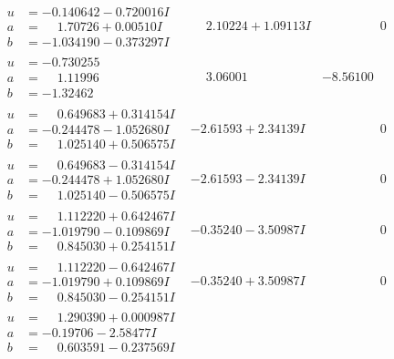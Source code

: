 \documentclass[1p]{elsarticle_modified}
\theoremstyle{definition}
\begin{document}
$$\begin{array}{c|c|c}
\begin{aligned}
u &= -0.140642 - 0.720016 I \\
a &= \phantom{-}1.70726 + 0.00510 I \\
b &= -1.034190 - 0.373297 I\end{aligned}
 & \phantom{-}2.10224 + 1.09113 I & \phantom{-0.000000 } 0 \\ \hline\begin{aligned}
u &= -0.730255\phantom{ +0.000000I} \\
a &= \phantom{-}1.11996\phantom{ +0.000000I} \\
b &= -1.32462\phantom{ +0.000000I}\end{aligned}
 & \phantom{-}3.06001\phantom{ +0.000000I} & -8.56100\phantom{ +0.000000I} \\ \hline\begin{aligned}
u &= \phantom{-}0.649683 + 0.314154 I \\
a &= -0.244478 - 1.052680 I \\
b &= \phantom{-}1.025140 + 0.506575 I\end{aligned}
 & -2.61593 + 2.34139 I & \phantom{-0.000000 } 0 \\ \hline\begin{aligned}
u &= \phantom{-}0.649683 - 0.314154 I \\
a &= -0.244478 + 1.052680 I \\
b &= \phantom{-}1.025140 - 0.506575 I\end{aligned}
 & -2.61593 - 2.34139 I & \phantom{-0.000000 } 0 \\ \hline\begin{aligned}
u &= \phantom{-}1.112220 + 0.642467 I \\
a &= -1.019790 - 0.109869 I \\
b &= \phantom{-}0.845030 + 0.254151 I\end{aligned}
 & -0.35240 - 3.50987 I & \phantom{-0.000000 } 0 \\ \hline\begin{aligned}
u &= \phantom{-}1.112220 - 0.642467 I \\
a &= -1.019790 + 0.109869 I \\
b &= \phantom{-}0.845030 - 0.254151 I\end{aligned}
 & -0.35240 + 3.50987 I & \phantom{-0.000000 } 0 \\ \hline\begin{aligned}
u &= \phantom{-}1.290390 + 0.000987 I \\
a &= -0.19706 - 2.58477 I \\
b &= \phantom{-}0.603591 - 0.237569 I\end{aligned}

\end{array}$$
\end{document}

